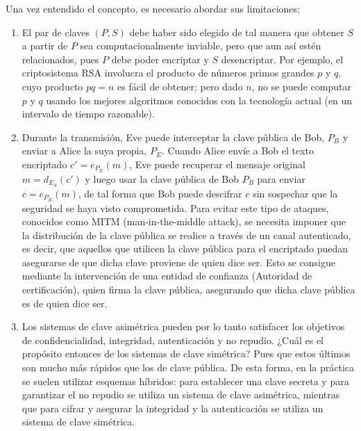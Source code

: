 Una vez entendido el concepto, es necesario abordar sus limitaciones:

\begin{enumerate}[label={--}]
    \item El par de claves $(P,S)$ debe haber sido elegido de tal manera que obtener $S$ a partir de $P$ sea computacionalmente inviable, pero que aun así estén relacionados, pues $P$ debe poder encriptar y $S$ desencriptar. Por ejemplo, el criptosistema RSA involucra el producto de números primos grandes $p$ y $q$, cuyo producto $pq = n$ es fácil de obtener; pero dado $n$, no se puede computar $p$ y $q$  usando los mejores algoritmos conocidos con la tecnología actual (en un intervalo de tiempo razonable).

    \item Durante la transmisión, Eve puede interceptar la clave pública de Bob, $P_B$ y enviar a Alice la suya propia, $P_E$. Cuando Alice envíe a Bob el texto encriptado $c' = e_{P_E}(m)$, Eve puede recuperar el mensaje original $m = d_{E_S}(c')$ y luego usar la clave pública de Bob $P_B$ para enviar $c = e_{P_B}(m)$, de tal forma que Bob puede descifrar $c$ sin sospechar que la seguridad se haya visto comprometida. Para evitar este tipo de ataques, conocidos como MITM (man-in-the-middle attack)\cite[p.~342]{Understanding_Crypto}, se necesita imponer que la distribución de la clave pública se realice a través de un canal autenticado, es decir, que aquellos que utilicen la clave pública para el encriptado puedan asegurarse de que dicha clave proviene de quien dice ser. Esto se consigue mediante la intervención de una entidad de confianza (Autoridad de certificación), quien firma la clave pública, asegurando que dicha clave pública es de quien dice ser.

    \item Los sistemas de clave asimétrica pueden por lo tanto satisfacer los objetivos de confidencialidad, integridad, autenticación y no repudio. ¿Cuál es el propósito entonces de los sistemas de clave simétrica? Pues que estos últimos son mucho más rápidos que los de clave pública. De esta forma, en la práctica se suelen utilizar esquemas híbridos: para establecer una clave secreta y para garantizar el no repudio se utiliza un sistema de clave asimétrica, mientras que para cifrar y asegurar la integridad y la autenticación se utiliza un sistema de clave simétrica.
\end{enumerate}